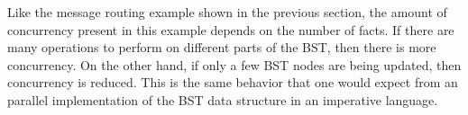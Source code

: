 Like the message routing example shown in the previous section, the amount of
concurrency present in this example depends on the number of 
facts. If there are many  operations to perform on different parts
of the BST, then there is more concurrency. On the other hand, if only a few BST
nodes are being updated, then concurrency is reduced. This is the same behavior
that one would expect from an parallel implementation of the BST data structure
in an imperative language.
